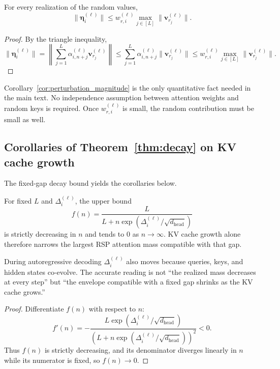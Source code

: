 \begin{corollary}\label{cor:perturbation_magnitude}
For every realization of the random values,
\[
\|\boldsymbol{\eta}_i^{(\ell)}\|
\le
w_{r,i}^{(\ell)} \max_{j \in [L]} \|\mathbf{v}_{r_j}^{(\ell)}\|.
\]
\end{corollary}

\begin{proof}
By the triangle inequality,
\[
\|\boldsymbol{\eta}_i^{(\ell)}\|
=
\left\|
\sum_{j=1}^{L} \alpha_{i,n+j}^{(\ell)} \mathbf{v}_{r_j}^{(\ell)}
\right\|
\le
\sum_{j=1}^{L} \alpha_{i,n+j}^{(\ell)} \|\mathbf{v}_{r_j}^{(\ell)}\|
\le
w_{r,i}^{(\ell)} \max_{j \in [L]} \|\mathbf{v}_{r_j}^{(\ell)}\|.
\]
\end{proof}

Corollary~\ref{cor:perturbation_magnitude} is the only quantitative fact needed in the main text. No independence assumption between attention weights and random keys is required. Once $w_{r,i}^{(\ell)}$ is small, the random contribution must be small as well.

\subsection{Corollaries of Theorem~\ref{thm:decay} on KV cache growth}

The fixed-gap decay bound yields the corollaries below.

\begin{corollary}\label{cor:sequence_annealing}
For fixed $L$ and $\Delta_i^{(\ell)}$, the upper bound
\[
f(n)=\frac{L}{L+n\exp(\Delta_i^{(\ell)}/\sqrt{d_{\text{head}}})}
\]
is strictly decreasing in $n$ and tends to $0$ as $n\to\infty$. KV cache growth alone therefore narrows the largest RSP attention mass compatible with that gap.
\end{corollary}

\noindent During autoregressive decoding $\Delta_i^{(\ell)}$ also moves because queries, keys, and hidden states co-evolve. The accurate reading is not ``the realized mass decreases at every step'' but ``the envelope compatible with a fixed gap shrinks as the KV cache grows.''

\begin{proof}
Differentiate $f(n)$ with respect to $n$:
\[
f'(n)
=
-\frac{L\exp(\Delta_i^{(\ell)}/\sqrt{d_{\text{head}}})}{\left(L+n\exp(\Delta_i^{(\ell)}/\sqrt{d_{\text{head}}})\right)^2}
<
0.
\]
Thus $f(n)$ is strictly decreasing, and its denominator diverges linearly in $n$ while its numerator is fixed, so $f(n)\to0$.
\end{proof}

